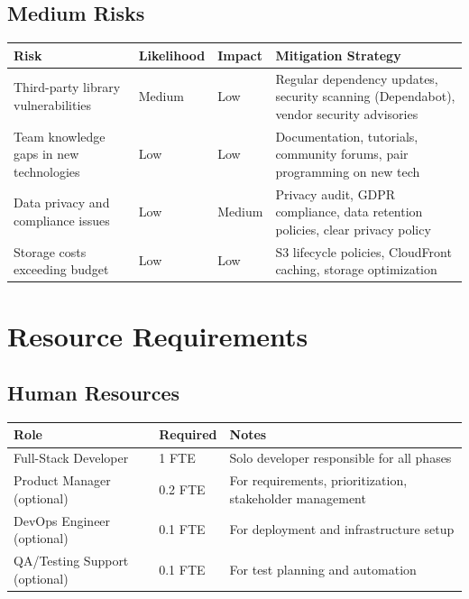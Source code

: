\documentclass[12pt,oneside]{report}
\begin{document}
\section{Medium Risks}

\begin{table}[h]
\centering
\begin{tabular}{|p{2.5cm}|p{2cm}|p{2cm}|p{3.5cm}|}
\hline
\rowcolor{lightgreen}
\textbf{Risk} & \textbf{Likelihood} & \textbf{Impact} & \textbf{Mitigation Strategy} \\
\hline
Third-party library vulnerabilities & Medium & Low & Regular dependency updates, security scanning (Dependabot), vendor security advisories \\
\hline
Team knowledge gaps in new technologies & Low & Low & Documentation, tutorials, community forums, pair programming on new tech \\
\hline
Data privacy and compliance issues & Low & Medium & Privacy audit, GDPR compliance, data retention policies, clear privacy policy \\
\hline
Storage costs exceeding budget & Low & Low & S3 lifecycle policies, CloudFront caching, storage optimization \\
\hline
\end{tabular}
\end{table}

\chapter{Resource Requirements}

\section{Human Resources}

\begin{table}[h]
\centering
\begin{tabular}{|l|l|l|}
\hline
\rowcolor{lightblue}
\textbf{Role} & \textbf{Required} & \textbf{Notes} \\
\hline
Full-Stack Developer & 1 FTE & Solo developer responsible for all phases \\
\hline
Product Manager (optional) & 0.2 FTE & For requirements, prioritization, stakeholder management \\
\hline
DevOps Engineer (optional) & 0.1 FTE & For deployment and infrastructure setup \\
\hline
QA/Testing Support (optional) & 0.1 FTE & For test planning and automation \\
\hline
\end{tabular}
\end{table}
\end{document}
